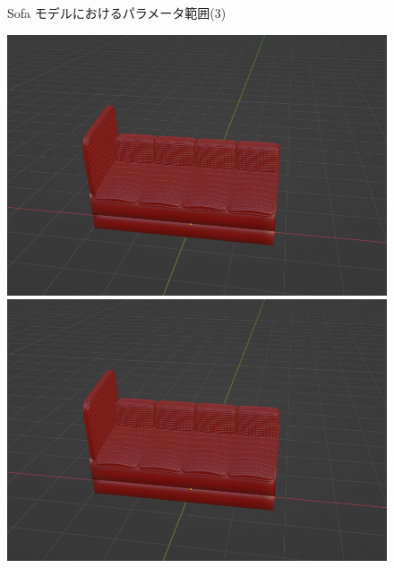 \begin{figure}[h]
\begin{minipage}[b]{0.48\linewidth}
 \end{minipage}
 \caption{Sofa モデルにおけるパラメータ範囲(3)}\label{fig:sofaParamMean_3}
\end{figure}


\begin{figure}[h]
 \begin{minipage}[b]{0.48\linewidth}
  \centering
  \includegraphics[scale=0.17]{./imgs/sofaParamMean/sideTicknessMin.png}
 \end{minipage}
 \begin{minipage}[b]{0.48\linewidth}
  \centering
  \includegraphics[scale=0.17]{./imgs/sofaParamMean/sideTicknessMax.png}
 \end{minipage}\\

\end{figure}
